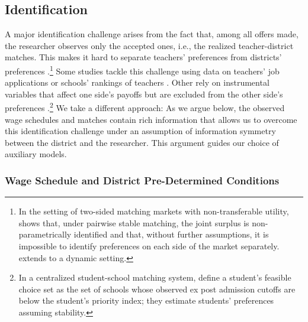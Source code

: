 \documentclass[notitlepage,12pt]{article}%
\begin{document}
\subsection{Identification}

A major identification challenge arises from the fact that, among all offers
made, the researcher observes only the accepted ones, i.e., the realized
teacher-district matches. This makes it hard to separate teachers' preferences
from districts' preferences
\citep[see, for example,][]{menzel2015large}.\footnote{In the setting of
two-sided matching markets with non-transferable utility,
\citet{menzel2015large} shows that, under pairwise stable matching, the joint
surplus is non-parametrically identified and that, without further
assumptions, it is impossible to identify preferences on each side of the
market separately. \citet{ederer2023labor} extends \citet{menzel2015large} to
a dynamic setting.} Some studies tackle this challenge using data on teachers' job applications \citep{bates2022teacher} or schools' rankings of
teachers \citep{ederer2023labor}. Other rely on instrumental variables that
affect one side's payoffs but are excluded from the other side's preferences \citep{agarwal2015empirical,laverde2025gains}.\footnote{In a
centralized student-school matching system, \citet{fack2019beyond} define a
student's feasible choice set as the set of schools whose observed ex post
admission cutoffs are below the student's priority index; they estimate
students' preferences assuming stability.} We take a different approach: As we argue below, the observed wage schedules and matches contain rich information that allows us to overcome this identification challenge under an assumption of information symmetry between the district and the researcher. This argument guides our choice of auxiliary models.

\subsubsection{Wage Schedule and District Pre-Determined Conditions\label{id2}%
}
\end{document}
